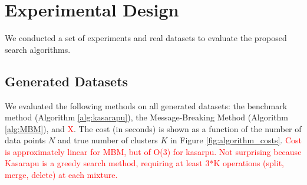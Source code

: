 \documentclass{elsarticle}
\newcommand{\todo}[1]{\textcolor{red}{#1}}
\def\weight{w}
\begin{document}
\section{Experimental Design}

We conducted a set of experiments and real datasets to evaluate the proposed
search algorithms.

\subsection{Generated Datasets}

We evaluated the following methods on all generated datasets: the benchmark method (Algorithm \ref{alg:kasarapu}), the Message-Breaking Method (Algorithm \ref{alg:MBM}), and \todo{X}. The cost (in seconds) is shown as a function of the number of data points $N$ and true number of clusters $K$ in Figure \ref{fig:algorithm_costs}.
\todo{Cost is approximately linear for MBM, but of O(3) for kasarpu. Not surprising because Kasarapu is a greedy search method, requiring at least 3*K operations (split, merge, delete) at each mixture.}
\end{document}

